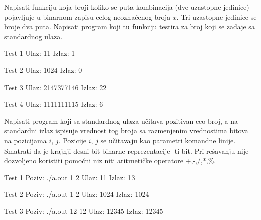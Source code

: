 \begin{Exercise}[label=208]
Napisati funkciju koja broji koliko se puta kombinacija
   (dve uzastopne jedinice) pojavljuje u binarnom zapisu
  celog neoznačenog broja $x$. Tri uzastopne jedinice se broje
  dva puta.  Napisati program koji tu funkciju testira za broj koji se
  zadaje sa standardnog ulaza.
  
\begin{minitest}
\begin{test}{Test 1}
Ulaz:   11  
Izlaz:  1    
\end{test}
\end{minitest}
\begin{minitest}
\begin{test}{Test 2}
Ulaz:   1024
Izlaz:  0 
\end{test}
\end{minitest}
\begin{minitest}
\begin{test}{Test 3}
Ulaz:   2147377146
Izlaz:  22
\end{test}
\end{minitest}

\begin{minitest}
\begin{test}{Test 4}
Ulaz:   1111111115
Izlaz:  6 
\end{test}
\end{minitest}
\end{Exercise}
\begin{Answer}[ref=208]
\end{Answer}


\begin{Exercise}[label=209]
Napisati program koji sa standardnog ulaza učitava pozitivan
  ceo broj, a na standardni izlaz ispisuje vrednost tog broja sa
  razmenjenim vrednostima bitova na pozicijama $i$,
  $j$. Pozicije $i$, $j$ se učitavaju kao parametri
  komandne linije. Smatrati da je krajnji desni bit binarne
  reprezentacije -ti bit. Pri rešavanju nije dozvoljeno koristiti
  pomoćni niz niti aritmetičke operatore +,-,/,*,\%.

\begin{minitest}
\begin{test}{Test 1}
Poziv:  ./a.out 1 2 
Ulaz:   11             
Izlaz:  13            
\end{test}
\end{minitest}
\begin{minitest}
\begin{test}{Test 2}
Poziv: ./a.out 1 2
Ulaz:   1024     
Izlaz:  1024        
\end{test}
\end{minitest}
\begin{minitest}
\begin{test}{Test 3}
Poziv: ./a.out 12 12
Ulaz:   12345
Izlaz:  12345
\end{test}
\end{minitest}
\end{Exercise}
\begin{Answer}[ref=209]
\end{Answer}

